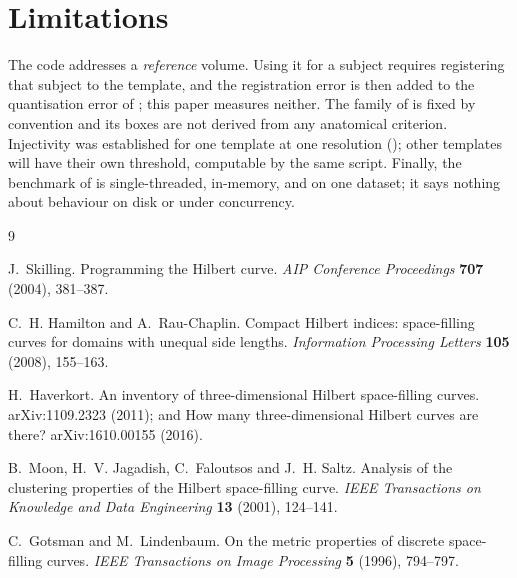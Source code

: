 \documentclass[11pt,a4paper]{article}
\theoremstyle{plain}
\theoremstyle{definition}
\theoremstyle{remark}
\begin{document}
\section{Limitations}

The code addresses a \emph{reference} volume. Using it for a subject
requires registering that subject to the template, and the registration
error is then added to the quantisation error of ; this
paper measures neither. The family of  is fixed by
convention and its boxes are not derived from any anatomical criterion.
Injectivity was established for one template at one resolution
(); other templates will have their own threshold,
computable by the same script. Finally, the benchmark of 
is single-threaded, in-memory, and on one dataset; it says nothing about
behaviour on disk or under concurrency.

\begin{thebibliography}{9}

 J.~Skilling. Programming the Hilbert curve.
\emph{AIP Conference Proceedings} \textbf{707} (2004), 381--387.

 C.~H. Hamilton and A.~Rau-Chaplin. Compact Hilbert
indices: space-filling curves for domains with unequal side lengths.
\emph{Information Processing Letters} \textbf{105} (2008), 155--163.

 H.~Haverkort. An inventory of three-dimensional Hilbert
space-filling curves. arXiv:1109.2323 (2011); and
How many three-dimensional Hilbert curves are there? arXiv:1610.00155
(2016).

 B.~Moon, H.~V. Jagadish, C.~Faloutsos and J.~H. Saltz.
Analysis of the clustering properties of the Hilbert space-filling curve.
\emph{IEEE Transactions on Knowledge and Data Engineering} \textbf{13}
(2001), 124--141.

 C.~Gotsman and M.~Lindenbaum. On the metric properties of
discrete space-filling curves. \emph{IEEE Transactions on Image Processing}
\textbf{5} (1996), 794--797.

\end{thebibliography}
\end{document}
